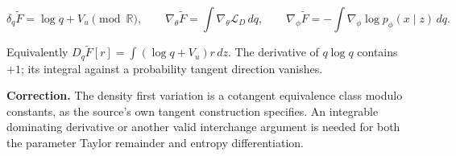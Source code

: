 \documentclass[11pt,a4paper]{report}
\begin{document}
        \[\delta_q\widetilde F=\log q+V_u\pmod{\mathbb R},\qquad
        \nabla_\theta\widetilde F=\int\nabla_\theta\mathcal L_D\,dq,\qquad
        \nabla_\phi\widetilde F=-\int\nabla_\phi\log p_\phi(x\mid z)\,dq.\]


Equivalently \(D_q\widetilde F[r]=\int(\log q+V_u)r\,dz\).
        The derivative of \(q\log q\) contains \(+1\); its integral against a
        probability tangent direction vanishes.



\textbf{Correction.} The density first variation is a cotangent equivalence class modulo constants, as the source's own tangent construction specifies. An integrable dominating derivative or another valid interchange argument is needed for both the parameter Taylor remainder and entropy differentiation.
\end{document}
